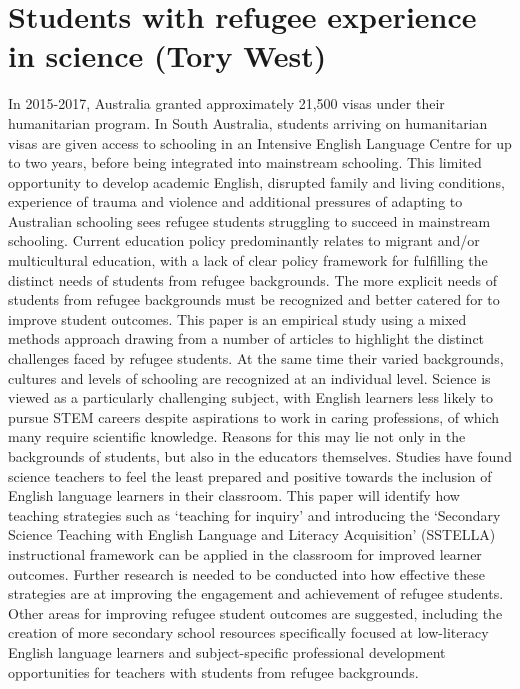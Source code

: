 \documentclass[twoside,14pt,a4paper,notitlepage]{memoir}
\begin{document}
\section*{Students with refugee experience in science (Tory West)}
\label{aut:west}

In 2015-2017, Australia granted approximately 21,500 visas under their humanitarian program. In South Australia, students arriving on humanitarian visas are given access to schooling in an Intensive English Language Centre for up to two years, before being integrated into mainstream schooling. This limited opportunity to develop academic English, disrupted family and living conditions, experience of trauma and violence and additional pressures of adapting to Australian schooling sees refugee students struggling to succeed in mainstream schooling.
Current education policy predominantly relates to migrant and/or multicultural education, with a lack of clear policy framework for fulfilling the distinct needs of students from refugee backgrounds. The more explicit needs of students from refugee backgrounds must be recognized and better catered for to improve student outcomes.
This paper is an empirical study using a mixed methods approach drawing from a number of articles to highlight the distinct challenges faced by refugee students. At the same time their varied backgrounds, cultures and levels of schooling are recognized at an individual level.
Science is viewed as a particularly challenging subject, with English learners less likely to pursue STEM careers despite aspirations to work in caring professions, of which many require scientific knowledge. Reasons for this may lie not only in the backgrounds of students, but also in the educators themselves. Studies have found science teachers to feel the least prepared and positive towards the inclusion of English language learners in their classroom. This paper will identify how teaching strategies such as ‘teaching for inquiry’ and introducing the ‘Secondary Science Teaching with English Language and Literacy Acquisition’ (SSTELLA) instructional framework can be applied in the classroom for improved learner outcomes. Further research is needed to be conducted into how effective these strategies are at improving the engagement and achievement of refugee students. Other areas for improving refugee student outcomes are suggested, including the creation of more secondary school resources specifically focused at low-literacy English language learners and subject-specific professional development opportunities for teachers with students from refugee backgrounds.
\end{document}
